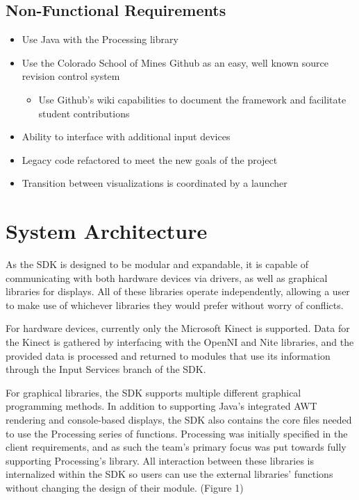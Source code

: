 \documentclass[11pt,letterpaper]{article}
\begin{document}
	\subsection{Non-Functional Requirements}
	\begin{itemize}
		\item Use Java with the Processing library
		\item Use the Colorado School of Mines Github as an easy, well known source revision control system
		\begin{itemize}
			\item Use Github's wiki capabilities to document the framework and facilitate student contributions
		\end{itemize}
		\item Ability to interface with additional input devices
		\item Legacy code refactored to meet the new goals of the project
		\item Transition between visualizations is coordinated by a launcher
	\end{itemize}
	\pagebreak

	\section{System Architecture}
	As the SDK is designed to be modular and expandable, it is capable of 
	communicating with both hardware devices via drivers, as well as graphical 
	libraries for displays. All of these libraries operate independently, 
	allowing a user to make use of whichever libraries they would prefer 
	without worry of conflicts. 

	For hardware devices, currently only the Microsoft Kinect is supported. 
	Data for the Kinect is gathered by interfacing with the OpenNI and Nite 
	libraries, and the provided data is processed and returned to modules that 
	use its information through the Input Services branch of the SDK. 

	For graphical libraries, the SDK supports multiple different graphical 
	programming methods. In addition to supporting Java's integrated AWT 
	rendering and console-based displays, the SDK also contains the core files 
	needed to use the Processing series of functions. Processing was initially 
	specified in the client requirements, and as such the team's primary focus 
	was put towards fully supporting Processing's library. All interaction 
	between these libraries is internalized within the SDK so users can use 
	the external libraries' functions without changing the design of their module. 
	(Figure 1)
	\pagebreak
   
\end{document}
